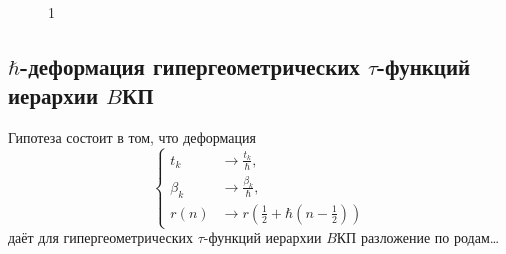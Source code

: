 \documentclass[a5paper,twoside]{article}
\numberwithin{equation}{section}
\begin{document}
\begin{figure}[ht]
    \centering
    \caption{1}
    \label{fig:1}
\end{figure}
\subsection{$\hbar $-деформация  гипергеометрических $\tau$-функций
иерархии $B$КП}
Гипотеза состоит в том, что деформация
\begin{equation}
\left\{
\begin{aligned}
	t_k &\to \frac{t_k}{\hbar },\\
	\beta_k &\to  \frac{\beta_k}{\hbar },\\
	r(n) &\to r \left( \frac{1}{2}+ \hbar \left( n-\frac{1}{2} \right)  \right) 
\end{aligned}
\right.
\end{equation} 
даёт для гипергеометрических $\tau$-функций иерархии
 $B $КП разложение по родам\ldots 


%
\end{document}
